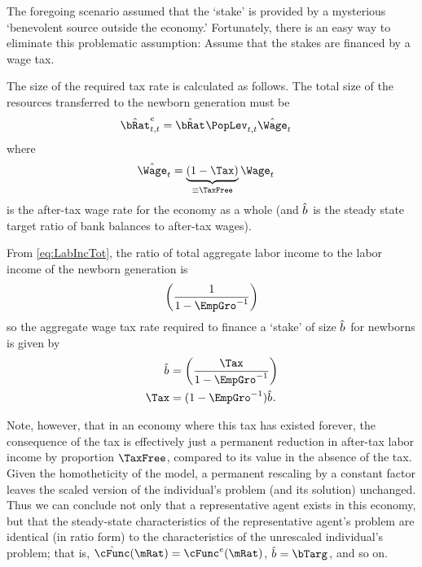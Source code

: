 \documentclass{handout}
\begin{document}
The foregoing scenario assumed that the `stake' is provided by a mysterious
`benevolent source outside the economy.'  Fortunately, there is an
easy way to eliminate this problematic assumption: Assume that the
stakes are financed by a wage tax.

The size of the required tax rate is calculated as follows.  The total size
of the resources transferred to the newborn generation must be
\begin{equation}\begin{gathered}\begin{aligned}
  \hat{\bRat}^{e}_{t,t} & =  \hat{\bRat}^{\null} \PopLev_{t,t} \hat{\Wage}_{t}
\end{aligned}\end{gathered}\end{equation}
where
\begin{equation}\begin{gathered}\begin{aligned}
  \hat{\Wage}_{t} & =  \underbrace{\left(1-\Tax \right)}_{\equiv \TaxFree}\Wage_{t}
\end{aligned}\end{gathered}\end{equation}
is the after-tax wage rate for the economy as a whole (and $\hat{b}^{\null}$ is the steady state target ratio of bank balances to after-tax wages).

From \eqref{eq:LabIncTot}, the ratio of total aggregate labor income 
to the labor income of the newborn generation is 
\begin{equation}\begin{gathered}\begin{aligned}
  \left(\frac{1}{1-\EmpGro^{-1}}\right)
\end{aligned}\end{gathered}\end{equation}
so the aggregate wage tax rate required to finance a `stake' of size $\hat{b}^{\null}$ for
newborns is given by 
\begin{equation}\begin{gathered}\begin{aligned}
  \hat{b}^{\null} & =    \left(\frac{\Tax}{1-\EmpGro^{-1}}\right)
\\ \Tax & =  (1-\EmpGro^{-1})\hat{b}^{\null}
.
\end{aligned}\end{gathered}\end{equation}

Note, however, that in an economy where this tax has existed forever, the consequence
of the tax is effectively just a permanent reduction in after-tax labor income by proportion $\TaxFree$, compared to its value in the absence of the tax.  
Given the homotheticity of the model, a permanent rescaling by a constant 
factor leaves the scaled version of the individual's problem (and its solution)
unchanged.  Thus we can conclude not only that a representative agent exists
in this economy, but that the steady-state characteristics of the 
representative agent's problem are identical (in ratio form) to the 
characteristics of the unrescaled individual's problem; that is, 
$\hat{\cFunc}(\mRat) = \cFunc^{e}(\mRat)$, $\hat{b}^{\null} = \bTarg^{\null}$, and so on.  
\end{document}

